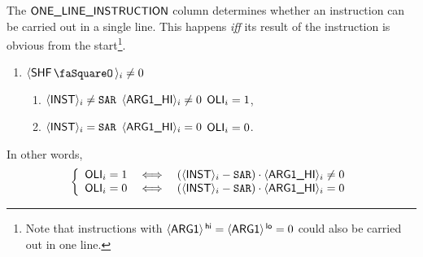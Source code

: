 The $\OLI$ column determines whether an instruction can be carried out in a single line. This happens \emph{iff} its result of the instruction is obvious from the start\footnote{Note that instructions with $\iArgOne\high = \iArgOne\low = 0$ could also be carried out in one line.}.
\begin{enumerate}
	\item \If $\iShfStamp_{i} \neq 0$ \Then
	\begin{enumerate}
		\item \If $\iInst_{i} \neq \inst{SAR}$ \et $\iArgOneHi_{i} \neq 0$ \Then $\oli_{i} = 1$,
		\item \If $\iInst_{i} =    \inst{SAR}$ \OR $\iArgOneHi_{i} =    0$ \Then $\oli_{i} = 0$.
	\end{enumerate}
\end{enumerate}
In other words,
\[
\left\{
\begin{array}{lcl}
	\oli_{i} = 1 & \iff & (\iInst_{i} - \inst{SAR}) \cdot \iArgOneHi_{i} \neq 0 \\
	\oli_{i} = 0 & \iff & (\iInst_{i} - \inst{SAR}) \cdot \iArgOneHi_{i} = 0 \\
\end{array}
\right.
\]